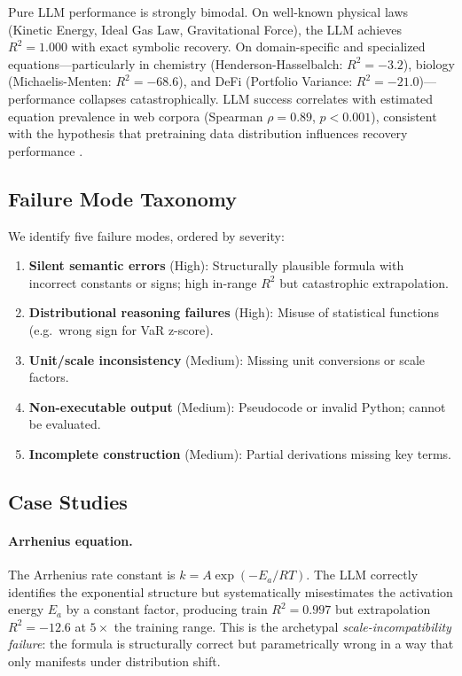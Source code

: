 \documentclass[twoside,11pt]{article}
\newcommand{\Rsq}{R^{2}}
\begin{document}
Pure LLM performance is strongly bimodal. On well-known physical laws (Kinetic Energy, Ideal Gas Law, Gravitational Force), the LLM achieves $\Rsq = 1.000$ with exact symbolic recovery. On domain-specific and specialized equations---particularly in chemistry (Henderson-Hasselbalch: $\Rsq = -3.2$), biology (Michaelis-Menten: $\Rsq = -68.6$), and DeFi (Portfolio Variance: $\Rsq = -21.0$)---performance collapses catastrophically. LLM success correlates with estimated equation prevalence in web corpora (Spearman $\rho = 0.89$, $p < 0.001$), consistent with the hypothesis that pretraining data distribution influences recovery performance \citep{kambhampati2024llms}.

\subsection{Failure Mode Taxonomy}\label{subsec:failure-mode-taxonomy}
\label{sec:llm_failures}

We identify five failure modes, ordered by severity:
\begin{enumerate}
  \item \textbf{Silent semantic errors} (High): Structurally plausible formula with incorrect constants or signs; high in-range $\Rsq$ but catastrophic extrapolation.
  \item \textbf{Distributional reasoning failures} (High): Misuse of statistical functions (e.g.\ wrong sign for VaR z-score).
  \item \textbf{Unit/scale inconsistency} (Medium): Missing unit conversions or scale factors.
  \item \textbf{Non-executable output} (Medium): Pseudocode or invalid Python; cannot be evaluated.
  \item \textbf{Incomplete construction} (Medium): Partial derivations missing key terms.
\end{enumerate}

\subsection{Case Studies}\label{subsec:case-studies}
\label{sec:llm_cases}

\paragraph{Arrhenius equation.}
The Arrhenius rate constant is $k = A \exp\!(-E_a/RT)$. The LLM correctly identifies the exponential structure but systematically misestimates the activation energy $E_a$ by a constant factor, producing train $\Rsq = 0.997$ but extrapolation $\Rsq = -12.6$ at $5\times$ the training range. This is the archetypal \emph{scale-incompatibility failure}: the formula is structurally correct but parametrically wrong in a way that only manifests under distribution shift.
\end{document}
